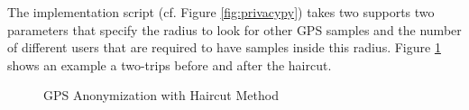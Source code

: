 The implementation script (cf. Figure \ref{fig:privacypy}) takes two
supports two parameters that specify the radius to look for other GPS
samples and the number of different users that are required to have
samples inside this radius. Figure \ref{fig:haircut} shows an example
a two-trips before and after the haircut.

\begin{figure}
  \centering
  \quad
  \caption{GPS Anonymization with Haircut Method}
  \label{fig:haircut}
\end{figure}

